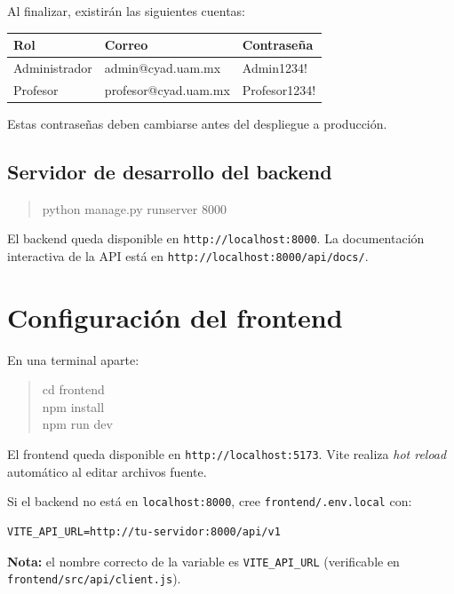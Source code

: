 \documentclass{computacion}
\begin{document}
Al finalizar, existirán las siguientes cuentas:

\begin{longtable}{p{} p{} p{}}
    \toprule
    \textbf{Rol} & \textbf{Correo} & \textbf{Contraseña} \\
    \midrule
    \endhead
    Administrador & admin@cyad.uam.mx & Admin1234! \\
    \midrule
    Profesor & profesor@cyad.uam.mx & Profesor1234! \\
    \bottomrule
\end{longtable}

Estas contraseñas deben cambiarse antes del despliegue a producción.

\subsection{Servidor de desarrollo del backend}

\begin{quote}
\ttfamily
python manage.py runserver 8000
\end{quote}

El backend queda disponible en \texttt{http://localhost:8000}. La documentación interactiva de la API está en \texttt{http://localhost:8000/api/docs/}.

\section{Configuración del frontend}

En una terminal aparte:

\begin{quote}
\ttfamily
cd frontend \\
npm install \\
npm run dev
\end{quote}

El frontend queda disponible en \texttt{http://localhost:5173}. Vite realiza \emph{hot reload} automático al editar archivos fuente.

Si el backend no está en \texttt{localhost:8000}, cree \texttt{frontend/.env.local} con:

\begin{Verbatim}[fontsize=\small, frame=single]
VITE_API_URL=http://tu-servidor:8000/api/v1
\end{Verbatim}

\textbf{Nota:} el nombre correcto de la variable es \texttt{VITE\_API\_URL} (verificable en \texttt{frontend/src/api/client.js}).
\end{document}
